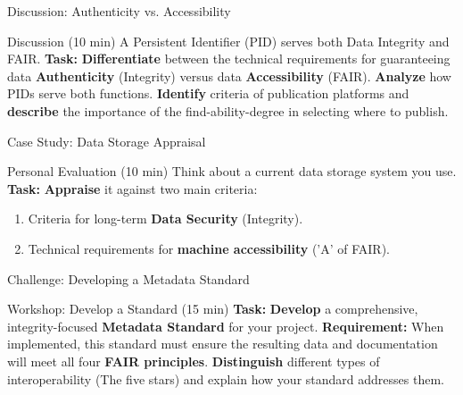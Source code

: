 \documentclass{integrity} %
\begin{document}
\begin{frame}{Discussion: Authenticity vs. Accessibility}
    \begin{block}{Discussion (10 min)}
        A Persistent Identifier (PID) serves both Data Integrity and FAIR.
        \pause
        \textbf{Task:} \textbf{Differentiate} between the technical requirements for guaranteeing data \textbf{Authenticity} (Integrity) versus data \textbf{Accessibility} (FAIR).
        \pause
        \textbf{Analyze} how PIDs serve both functions.
        \pause
        \textbf{Identify} criteria of publication platforms and \textbf{describe} the importance of the find-ability-degree in selecting where to publish.
    \end{block}
\end{frame}

\begin{frame}{Case Study: Data Storage Appraisal}
    \begin{block}{Personal Evaluation (10 min)}
        Think about a current data storage system you use.
        \pause
        \textbf{Task:} \textbf{Appraise} it against two main criteria:
        \begin{enumerate}
            \item \pause Criteria for long-term \textbf{Data Security} (Integrity).
            \item \pause Technical requirements for \textbf{machine accessibility} ('A' of FAIR).
        \end{enumerate}
    \end{block}
\end{frame}

\begin{frame}{Challenge: Developing a Metadata Standard}
    \begin{block}{Workshop: Develop a Standard (15 min)}
        \textbf{Task:} \textbf{Develop} a comprehensive, integrity-focused \textbf{Metadata Standard} for your project.
        \pause
        \textbf{Requirement:} When implemented, this standard must ensure the resulting data and documentation will meet all four \textbf{FAIR principles}.
        \pause
        \textbf{Distinguish} different types of interoperability (The five stars) and explain how your standard addresses them.
    \end{block}
\end{frame}

\end{document}

